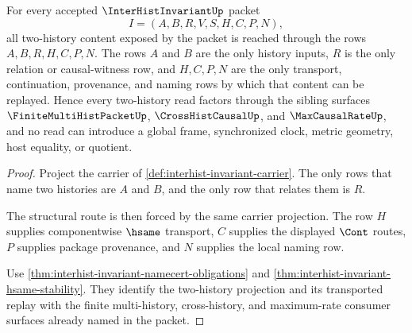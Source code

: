 \begin{theorem}
\label{thm:interhist-invariant-two-history-route-exactness}
For every accepted $\InterHistInvariantUp$ packet
$$
I=(A,B,R,V,S,H,C,P,N),
$$
all two-history content exposed by the packet is reached through the rows $A,B,R,H,C,P,N$. The rows $A$ and $B$ are the only history inputs, $R$ is the only relation or causal-witness row, and $H,C,P,N$ are the only transport, continuation, provenance, and naming rows by which that content can be replayed. Hence every two-history read factors through the sibling surfaces $\FiniteMultiHistPacketUp$, $\CrossHistCausalUp$, and $\MaxCausalRateUp$, and no read can introduce a global frame, synchronized clock, metric geometry, host equality, or quotient.
\end{theorem}
\begin{proof}
Project the carrier of \autoref{def:interhist-invariant-carrier}. The only rows that name two histories are $A$ and $B$, and the only row that relates them is $R$.

The structural route is then forced by the same carrier projection. The row $H$ supplies componentwise $\hsame$ transport, $C$ supplies the displayed $\Cont$ routes, $P$ supplies package provenance, and $N$ supplies the local naming row.

Use \autoref{thm:interhist-invariant-namecert-obligations} and \autoref{thm:interhist-invariant-hsame-stability}. They identify the two-history projection and its transported replay with the finite multi-history, cross-history, and maximum-rate consumer surfaces already named in the packet.
\end{proof}

